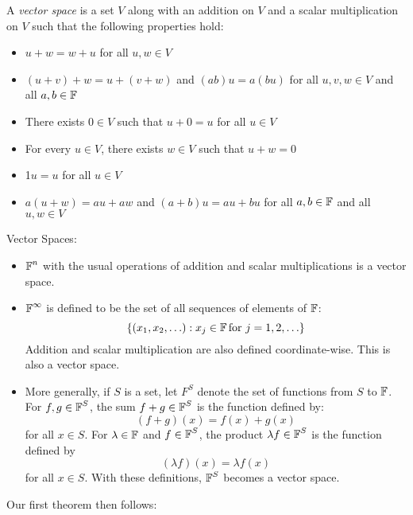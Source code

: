 \begin{definition}
    A \textit{vector space} is a set $V$ along with an addition on $V$ and a
    scalar multiplication on $V$ such that the following properties hold:

    \begin{itemize}
        \item $u + w = w + u$ for all $u, w \in V$
        \item $(u + v) + w = u + (v + w)$ and $(ab)u = a(bu)$ for all $u, v, w \in V$ and all $a, b \in \operatorname{\mathbb{F}}$
        \item There exists $0 \in V$ such that $u + 0 = u$ for all $u \in V$
        \item For every $u \in V$, there exists $w \in V$ such that $u + w = 0$
        \item 1$u = u$ for all $u \in V$
        \item $a (u + w) = au + aw$ and $(a+b)u = au + bu$ for all $a, b \in \operatorname{\mathbb{F}}$ and all $u, w \in V$
    \end{itemize}
\end{definition}

\begin{example} Vector Spaces:
    \begin{itemize}
        \item $\operatorname{\mathbb{F}}^n$ with the usual operations of addition and scalar multiplications is a vector space.
        \item $\operatorname{\mathbb{F}}^\infty$ is defined to be the set of all sequences of elements of $\operatorname{\mathbb{F}}$:
        \[ \{(x_1, x_2, \ldots) : x_j \in \operatorname{\mathbb{F}} \text{for } j = 1, 2, \ldots \} \]
        Addition and scalar multiplication are also defined coordinate-wise. This is also a vector space.
        \item More generally, if $S$ is a set, let $F^S$ denote the set of functions from $S$ to $\operatorname{\mathbb{F}}$.
        For $f, g \in \operatorname{\mathbb{F}}^S$, the sum $f + g \in \operatorname{\mathbb{F}}^S$ is the function defined by:
        \[ (f + g)(x)  = f(x) + g(x)\]
        for all $x \in S$.
        For $\lambda \in \operatorname{\mathbb{F}}$ and $f \in \operatorname{\mathbb{F}}^S$, the product $\lambda f \in \operatorname{\mathbb{F}}^S$ is the function defined by
        \[ (\lambda f)(x) = \lambda f(x) \]
        for all $x \in S$.
        With these definitions, $\operatorname{\mathbb{F}}^S$ becomes a vector space.
    \end{itemize}
\end{example}

Our first theorem then follows:

